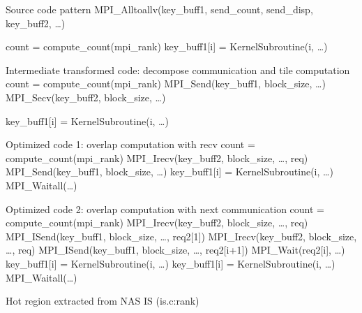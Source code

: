 

%
%
%
%
%

\begin{algorithm}
{\scriptsize
\begin{algorithmic}
\Require Source code pattern
\State MPI\_Alltoallv(key\_buff1, send\_count, send\_disp, key\_buff2, \ldots)

\State count = compute\_count(mpi\_rank)
  \State key\_buff1[i] = KernelSubroutine(i, \ldots)
\EndFor

\Ensure Intermediate transformed code: decompose communication and tile computation
\State count = compute\_count(mpi\_rank)
  \State MPI\_Send(key\_buff1, block\_size, \ldots)
  \State MPI\_Secv(key\_buff2, block\_size, \ldots)
\EndFor

    \State key\_buff1[i] = KernelSubroutine(i, \ldots)
  \EndFor
\EndFor

\Ensure Optimized code 1: overlap computation with recv
\State count = compute\_count(mpi\_rank)
  \State MPI\_Irecv(key\_buff2, block\_size, \ldots, req)
  \State MPI\_Send(key\_buff1, block\_size, \ldots)
    \State key\_buff1[i] = KernelSubroutine(i, \ldots)
  \EndFor
\EndFor
\State MPI\_Waitall(\ldots)

\Ensure Optimized code 2: overlap computation with next communication
\State count = compute\_count(mpi\_rank)
\State MPI\_Irecv(key\_buff2, block\_size, \ldots, req)
\State MPI\_ISend(key\_buff1, block\_size, \ldots, req2[1])
  \State MPI\_Irecv(key\_buff2, block\_size, \ldots, req)
  \State MPI\_ISend(key\_buff1, block\_size, \ldots, req2[i+1])
  \State MPI\_Wait(req2[i], \ldots)
    \State key\_buff1[i] = KernelSubroutine(i, \ldots)
  \EndFor
\EndFor
{}
  \State key\_buff1[i] = KernelSubroutine(i, \ldots)
\EndFor
\State MPI\_Waitall(\ldots)

\end{algorithmic}
\caption{Hot region extracted from NAS IS (is.c:rank)}
\label{pat:is}
}%
\end{algorithm}

